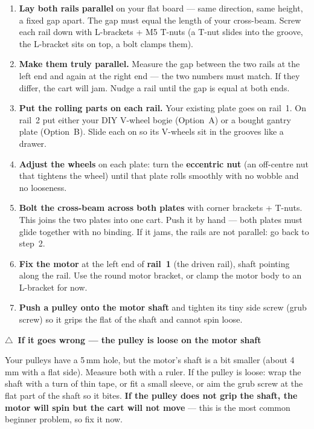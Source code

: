 \documentclass[11pt,a4paper]{article}
\newcommand{\warn}{\textcolor{orange!80!black}{$\triangle$}}
\newenvironment{checkbox}[1]
  {\par\medskip\noindent\begin{lrbox}{\gbbox}\begin{minipage}{0.95\linewidth}\footnotesize\textbf{#1}\par\smallskip}
  {\end{minipage}\end{lrbox}\setlength{\fboxsep}{8pt}\fcolorbox{red!60!black}{red!5}{\usebox{\gbbox}}\par\medskip}
\begin{document}
\begin{enumerate}[leftmargin=*,itemsep=3pt]
  \item \textbf{Lay both rails parallel} on your flat board --- same direction, same height, a fixed gap
  apart. The gap must equal the length of your cross-beam. Screw each rail down with L-brackets + M5
  T-nuts (a T-nut slides into the groove, the L-bracket sits on top, a bolt clamps them).
  \item \textbf{Make them truly parallel.} Measure the gap between the two rails at the left end and again
  at the right end --- the two numbers must match. If they differ, the cart will jam. Nudge a rail until
  the gap is equal at both ends.
  \item \textbf{Put the rolling parts on each rail.} Your existing plate goes on rail~1. On rail~2 put
  either your DIY V-wheel bogie (Option~A) or a bought gantry plate (Option~B). Slide each on so its
  V-wheels sit in the grooves like a drawer.
  \item \textbf{Adjust the wheels} on each plate: turn the \textbf{eccentric nut} (an off-centre nut that
  tightens the wheel) until that plate rolls smoothly with no wobble and no looseness.
  \item \textbf{Bolt the cross-beam across both plates} with corner brackets + T-nuts. This joins the two
  plates into one cart. Push it by hand --- both plates must glide together with no binding. If it jams,
  the rails are not parallel: go back to step~2.
  \item \textbf{Fix the motor} at the left end of \textbf{rail~1} (the driven rail), shaft pointing along
  the rail. Use the round motor bracket, or clamp the motor body to an L-bracket for now.
  \item \textbf{Push a pulley onto the motor shaft} and tighten its tiny side screw (grub screw) so it
  grips the flat of the shaft and cannot spin loose.
\end{enumerate}

\begin{checkbox}{\warn\ If it goes wrong --- the pulley is loose on the motor shaft}
Your pulleys have a 5\,mm hole, but the motor's shaft is a bit smaller (about 4\,mm with a flat side).
Measure both with a ruler. If the pulley is loose: wrap the shaft with a turn of thin tape, or fit a
small sleeve, or aim the grub screw at the flat part of the shaft so it bites. \textbf{If the pulley does
not grip the shaft, the motor will spin but the cart will not move} --- this is the most common beginner
problem, so fix it now.
\end{checkbox}
\end{document}
